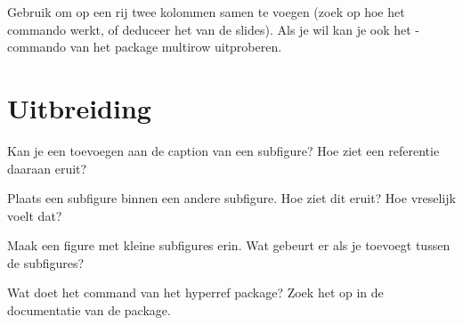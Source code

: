 \documentclass[a4paper]{article}
\begin{document}
    \begin{exercise}[Excellent]
        Gebruik \texttt{\multicolumn} om op een rij twee kolommen samen te voegen
        (zoek op hoe het commando werkt, of deduceer het van de slides). Als je
        wil kan je ook het \texttt{\multirow}-commando van het package multirow
        uitproberen.
    \end{exercise}



    \section{Uitbreiding}

    \begin{exercise}[tabularx]
        
    \end{exercise}

    \begin{exercise}
        Kan je een \texttt{\label{...}} toevoegen aan de caption van een subfigure?
        Hoe ziet een referentie daaraan eruit?
    \end{exercise}

    \begin{exercise}
        Plaats een subfigure binnen een andere subfigure. Hoe ziet dit eruit?
        Hoe vreselijk voelt dat?
    \end{exercise}

    \begin{exercise}
        Maak een figure met kleine subfigures erin. Wat gebeurt er als je
        \texttt{\hfill} toevoegt tussen de subfigures?
    \end{exercise}

    \begin{exercise}
        Wat doet het command \texttt{\texorpdfstring{}{}} van het hyperref package?
        Zoek het op in de documentatie van de package.
    \end{exercise}
\end{document}
